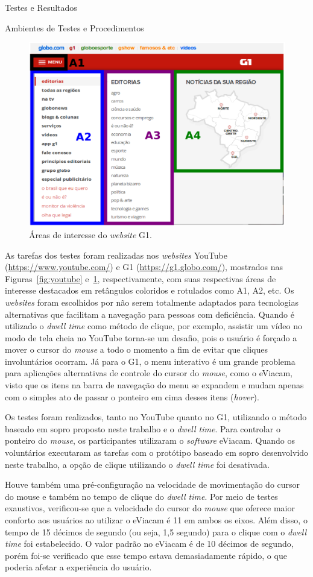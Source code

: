\begin{chapter}{Testes e Resultados}
\begin{section}{Ambientes de Testes e Procedimentos}
\begin{figure}[!b]
	\centering
	\includegraphics[width=.8\linewidth]{fig/g1}
	\caption{Áreas de interesse do \textit{website} G1.}
	\label{fig:g1}
\end{figure}

As tarefas dos testes foram realizadas nos \textit{websites}
YouTube (\url{https://www.youtube.com/}) e
G1 (\url{https://g1.globo.com/}), mostrados nas
Figuras~\ref{fig:youtube} e~\ref{fig:g1}, respectivamente, com suas respectivas
áreas de interesse destacados em retângulos coloridos e rotulados como A1, A2,
etc. Os \textit{websites} foram escolhidos por não serem totalmente adaptados
para tecnologias alternativas que facilitam a navegação para pessoas com
deficiência. Quando é utilizado o \textit{dwell time} como método de clique, por
exemplo, assistir um vídeo no modo de tela cheia no YouTube torna-se um desafio,
pois o usuário é forçado a mover o cursor do \textit{mouse} a todo o momento
a fim de evitar que cliques involuntários ocorram. Já para o G1, o menu
interativo é um grande problema para aplicações alternativas de controle
do cursor do \textit{mouse}, como o eViacam, visto que os itens na barra de
navegação do menu se expandem e mudam apenas com o simples ato de passar o
ponteiro em cima desses itens (\textit{hover}).

Os testes foram realizados, tanto no YouTube quanto no G1, utilizando o método
baseado em sopro proposto neste trabalho e o \textit{dwell time}. Para controlar
o ponteiro do \textit{mouse}, os participantes utilizaram o \textit{software}
eViacam. Quando os voluntários executaram as tarefas com o protótipo baseado em
sopro desenvolvido neste trabalho, a opção de clique utilizando o 
\textit{dwell time} foi desativada. 

Houve também uma pré-configuração na velocidade de movimentação do cursor do
mouse e também no tempo de clique do \textit{dwell time}. Por meio de testes
exaustivos, verificou-se que a velocidade do cursor do \textit{mouse} que
oferece maior conforto aos usuários ao utilizar o eViacam é 11 em ambos os eixos.
Além disso, o tempo de 15 décimos de segundo (ou seja, 1,5 segundo) para o
clique com o \textit{dwell time} foi estabelecido. O valor padrão no eViacam é
de 10 décimos de segundo, porém foi-se verificado que esse tempo estava
demasiadamente rápido, o que poderia afetar a experiência do usuário.


\end{section}
\end{chapter}
